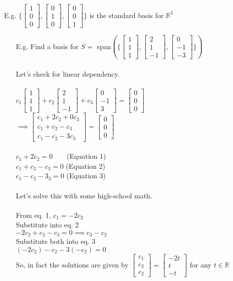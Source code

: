 \documentclass{letter}
\newcommand{\0}[1]{\begin{bmatrix}#1\end{bmatrix}}
\begin{document}
	E.g. $\{ \0{1\\0\\0}, \0{0\\1\\0}, \0{0\\0\\1} \}$ is the standard basis for $\mathbb{R}^3$
	\begin{itemize}
		\item[E.g.] Find a basis for $S =$ span$(\{ \0{1\\1\\1}, \0{2\\1\\-1}, \0{0\\-1\\-3} \})$\\\\
		Let's check for linear dependency.\\\\
		$c_1\0{1\\1\\1} + c_2\0{2\\1\\-1} + c_3\0{0\\-1\\3} = \0{0\\0\\0}$\\
		$\implies \0{c_1 + 2c_2 + 0c_3\\c_1+c_2-c_3\\c_1-c_2-3c_3} = \0{0\\0\\0}$\\\\
		$c_1 + 2c_2 = 0\;\;\;\;\;\;$ (Equation 1)\\
		$c_1 + c_2 - c_3 = 0$ (Equation 2)\\
		$c_1 - c_2 - 3_3 = 0$ (Equation 3)\\\\
		Let's solve this with some high-school math.\\\\
		From eq. 1, $c_1 = -2c_2$\\
		Substitute into eq. 2\\
		$-2 c_2 + c_2 - c_3 = 0 \implies c_3 -c_2$\\
		Substitute both into eq. 3\\
		$(-2 c_2) - c_2 - 3(-c_2) = 0$\\
		So, in fact the solutions are given by $\0{c_1\\c_2\\c_2} = \0{-2t\\t\\-t}$ for any $t \in \mathbb{R}$\\\\

\end{itemize}
\end{document}
